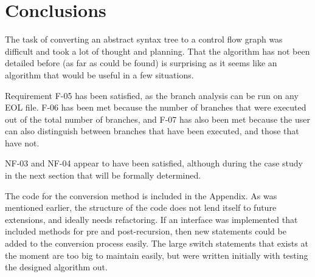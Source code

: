\section{Conclusions}

The task of converting an abstract syntax tree to a control flow graph was difficult and took a lot of thought and planning. That the algorithm has not been detailed before (as far as could be found) is surprising as it seems like an algorithm that would be useful in a few situations.

Requirement F-05 has been satisfied, as the branch analysis can be run on any EOL file. F-06 has been met because the number of branches that were executed out of the total number of branches, and F-07 has also been met because the user can also distinguish between branches that have been executed, and those that have not.

NF-03 and NF-04 appear to have been satisfied, although during the case study in the next section that will be formally determined.

The code for the conversion method is included in the Appendix. As was mentioned earlier, the structure of the code does not lend itself to future extensions, and ideally needs refactoring. If an interface was implemented that included methods for pre and post-recursion, then new statements could be added to the conversion process easily. The large switch statements that exists at the moment are too big to maintain easily, but were written initially with testing the designed algorithm out.